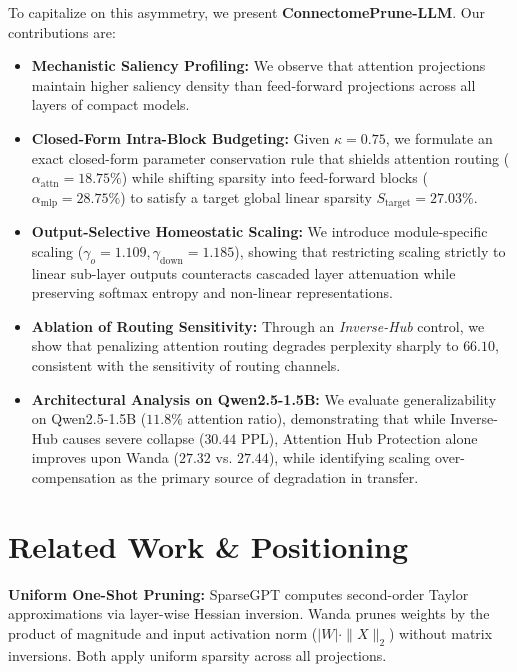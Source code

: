 \documentclass{article}
\begin{document}
To capitalize on this asymmetry, we present \textbf{ConnectomePrune-LLM}. Our contributions are:
\begin{itemize}
    \item \textbf{Mechanistic Saliency Profiling:} We observe that attention projections maintain higher saliency density than feed-forward projections across all layers of compact models.
    \item \textbf{Closed-Form Intra-Block Budgeting:} Given $\kappa = 0.75$, we formulate an exact closed-form parameter conservation rule that shields attention routing ($\alpha_{\text{attn}} = 18.75\%$) while shifting sparsity into feed-forward blocks ($\alpha_{\text{mlp}} = 28.75\%$) to satisfy a target global linear sparsity $S_{\text{target}} = 27.03\%$.
    \item \textbf{Output-Selective Homeostatic Scaling:} We introduce module-specific scaling ($\gamma_o = 1.109, \gamma_{\text{down}} = 1.185$), showing that restricting scaling strictly to linear sub-layer outputs counteracts cascaded layer attenuation while preserving softmax entropy and non-linear representations.
    \item \textbf{Ablation of Routing Sensitivity:} Through an \textit{Inverse-Hub} control, we show that penalizing attention routing degrades perplexity sharply to $66.10$, consistent with the sensitivity of routing channels.
    \item \textbf{Architectural Analysis on Qwen2.5-1.5B:} We evaluate generalizability on Qwen2.5-1.5B ($11.8\%$ attention ratio), demonstrating that while Inverse-Hub causes severe collapse ($30.44$ PPL), Attention Hub Protection alone improves upon Wanda ($27.32$ vs. $27.44$), while identifying scaling over-compensation as the primary source of degradation in transfer.
\end{itemize}

\section{Related Work \& Positioning}
\label{sec:related_work}

\textbf{Uniform One-Shot Pruning:} SparseGPT \cite{frantar2023sparsegpt} computes second-order Taylor approximations via layer-wise Hessian inversion. Wanda \cite{sun2023wanda} prunes weights by the product of magnitude and input activation norm ($|W| \cdot \|X\|_2$) without matrix inversions. Both apply uniform sparsity across all projections.
\end{document}
